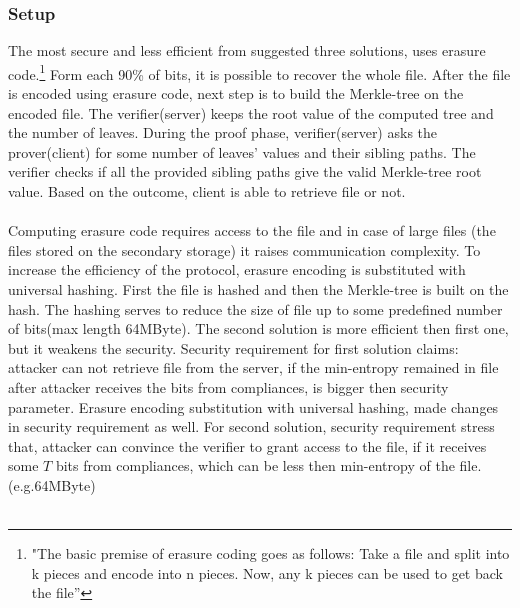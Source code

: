 \documentclass[12pt]{article}
\begin{document}
\subsubsection{Setup}
\label{subsub:setup1}
The most secure and less efficient  from suggested three solutions, uses erasure code.\footnote{"The basic premise of erasure coding goes as follows: Take a file and split into k pieces and
encode into n pieces. Now, any k pieces can be used to get back the file”} Form each 90\% of bits, it is possible to recover the whole file. After the file is encoded using erasure code, next step is to build the Merkle-tree\cite{Merkle} on the encoded file. The verifier(server) keeps the root value of the computed tree and the number of leaves. During the proof phase, verifier(server) asks the  prover(client)  for some number of leaves' values and their sibling paths. The verifier checks if all the provided sibling paths give the valid Merkle-tree root value. Based on the outcome, client is able to retrieve file or not. \\\\
Computing erasure code requires access to the file and in case of large files (the files stored on the secondary storage) it raises communication complexity. To increase the efficiency of the protocol, erasure encoding is substituted with universal hashing\cite{Hash}. First the file is hashed and then the Merkle-tree is built on the hash. The hashing serves to reduce the size of file up to some predefined number of bits(max length 64MByte). The second solution is more efficient then first one, but it  weakens the security. Security requirement for first solution claims: attacker can not retrieve file from the server, if the min-entropy remained in file after attacker receives the bits from compliances, is bigger then security parameter. Erasure encoding  substitution with universal hashing, made changes in security requirement as well. For second solution, security requirement stress that, attacker can convince the verifier to grant access to the file, if it receives some $T$ bits from compliances, which can be less then min-entropy of the file. (e.g.64MByte)\\\\
\end{document}
